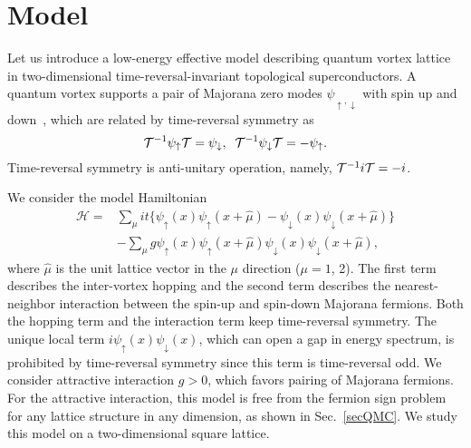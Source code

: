 \documentclass[aps,prb,superscriptaddress,twocolumn]{revtex4-1}
\newcommand{\cT}{{\cal T}}
\newcommand{\up}{\uparrow}
\newcommand{\down}{\downarrow}
\newcommand{\be}{\begin{equation}}
\newcommand{\ee}{\end{equation}}
\begin{document}
\section{Model}
\label{secmodel}
Let us introduce a low-energy effective model describing quantum vortex lattice in two-dimensional time-reversal-invariant topological superconductors.
A quantum vortex supports a pair of Majorana zero modes $\psi_{\up,\down}$ with spin up and down~\cite{PhysRevLett.102.187001}, which are related by time-reversal symmetry as
\be
\cT^{-1}\psi_\up\cT=\psi_\down,\;\;\cT^{-1}\psi_\down\cT=-\psi_\up.
\ee 
Time-reversal symmetry is anti-unitary operation, namely, $\cT^{-1}i\cT=-i$.

We consider the model Hamiltonian
\begin{equation}
\begin{split}
 \mathcal{H}
=& \sum_\mu it \{ \psi_\uparrow(x) \psi_\uparrow(x+\hat{\mu}) - \psi_\downarrow(x) \psi_\downarrow(x+\hat{\mu}) \}
\\
&- \sum_\mu g \psi_\uparrow(x) \psi_\uparrow(x+\hat{\mu}) \psi_\downarrow(x) \psi_\downarrow(x+\hat{\mu}) 
,
\end{split}
\label{eqH}
\end{equation}
where $\hat{\mu}$ is the unit lattice vector in the $\mu$ direction ($\mu=1$, 2).
The first term describes the inter-vortex hopping and the second term describes the nearest-neighbor interaction between the spin-up and spin-down Majorana fermions.
Both the hopping term and the interaction term keep time-reversal symmetry.
The unique local term $i \psi_\up(x)\psi_\down(x)$, which can open a gap in energy spectrum, is prohibited by time-reversal symmetry since this term is time-reversal odd.
We consider attractive interaction $g>0$, which favors pairing of Majorana fermions.
For the attractive interaction, this model is free from the fermion sign problem for any lattice structure in any dimension, as shown in Sec.~\ref{secQMC}.
We study this model on a two-dimensional square lattice.
\end{document}
